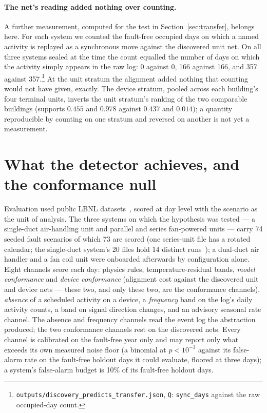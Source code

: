 \documentclass[runningheads]{llncs}
\begin{document}
\paragraph{The net's reading added nothing over counting.}
A further measurement, computed for the test in Section~\ref{sec:transfer}, belongs here. For each system we counted the fault-free occupied days on which a named activity is replayed as a synchronous move against the discovered unit net. On all three systems sealed at the time the count equalled the number of days on which the activity simply appears in the raw log: 0 against 0, 166 against 166, and 357 against 357.\footnote{\texttt{outputs/discovery\_predicts\_transfer.json}, \texttt{Q}: \texttt{sync\_days} against the raw occupied-day count.} At the unit stratum the alignment added nothing that counting would not have given, exactly. The device stratum, pooled across each building's four terminal units, inverts the unit stratum's ranking of the two comparable buildings (supports $0.455$ and $0.978$ against $0.437$ and $0.014$); a quantity reproducible by counting on one stratum and reversed on another is not yet a measurement.

\section{What the detector achieves, and the conformance null}
\label{sec:null}

Evaluation used public LBNL datasets~\cite{granderson2020lbnlfdddata,granderson2023lbnlfdddata}, scored at day level with the scenario as the unit of analysis. The three systems on which the hypothesis was tested --- a single-duct air-handling unit and parallel and series fan-powered units --- carry 74 seeded fault scenarios of which 73 are scored (one series-unit file has a rotated calendar; the single-duct system's 20 files hold 14 distinct runs~\cite{singh2027erratacompanion}); a dual-duct air handler and a fan coil unit were onboarded afterwards by configuration alone. Eight channels score each day: physics rules, temperature-residual bands, \emph{model conformance} and \emph{device conformance} (alignment cost against the discovered unit and device nets --- these two, and only these two, are the conformance channels), \emph{absence} of a scheduled activity on a device, a \emph{frequency} band on the log's daily activity counts, a band on signal direction changes, and an advisory seasonal rate channel. The absence and frequency channels read the event log the abstraction produced; the two conformance channels rest on the discovered nets. Every channel is calibrated on the fault-free year only and may report only what exceeds its own measured noise floor (a binomial at $p < 10^{-3}$ against its false-alarm rate on the fault-free holdout days it could evaluate, floored at three days); a system's false-alarm budget is 10\% of its fault-free holdout days.
\end{document}
